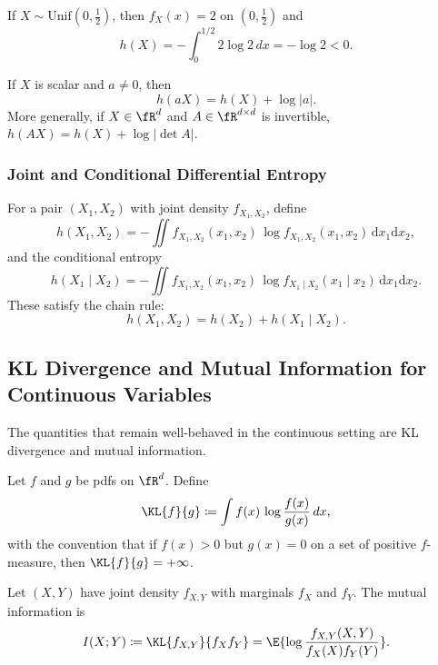 \begin{example}
If $X\sim\mathrm{Unif}(0,\tfrac12)$, then $f_X(x)=2$ on $(0,\tfrac12)$ and
\[
    h(X) = -\int_0^{1/2} 2\log 2\,dx = -\log 2 < 0.
\]
\end{example}

\begin{theorem}
If $X$ is scalar and $a\neq 0$, then
\begin{equation}
    h(aX)=h(X)+\log|a|.
\end{equation}
More generally, if $X\in\fR^d$ and $A\in\fR^{d\times d}$ is invertible,
\(h(AX)=h(X)+\log|\det A|\).
\end{theorem}


\subsubsection*{Joint and Conditional Differential Entropy}

For a pair $(X_1,X_2)$ with joint density $f_{X_1,X_2}$, define
\[
h(X_1,X_2)
=-\iint f_{X_1,X_2}(x_1,x_2)\,\log f_{X_1,X_2}(x_1,x_2)\,\mathrm{d}x_1\mathrm{d}x_2,
\]
and the conditional entropy
\[
h(X_1\mid X_2)
=-\iint f_{X_1,X_2}(x_1,x_2)\,\log f_{X_1\mid X_2}(x_1\mid x_2)\,\mathrm{d}x_1\mathrm{d}x_2.
\]
These satisfy the chain rule:
\[
h(X_1,X_2)=h(X_2)+h(X_1\mid X_2).
\]

\subsection{KL Divergence and Mutual Information for Continuous Variables}
\label{sec:diffent-mi}

The quantities that remain well-behaved in the continuous setting are KL divergence and mutual information.

\begin{definition}
Let $f$ and $g$ be pdfs on $\fR^d$.
Define
\begin{equation}
    \KL{f}{g} \coloneqq \int f(x)\,\log\frac{f(x)}{g(x)}\,dx,
\end{equation}
with the convention that if $f(x)>0$ but $g(x)=0$ on a set of positive $f$-measure, then $\KL{f}{g}=+\infty$.
\end{definition}

\begin{definition}
Let $(X,Y)$ have joint density $f_{X,Y}$ with marginals $f_X$ and $f_Y$.
The mutual information is
\begin{equation}
    I(X;Y)
    \coloneqq \KL{f_{X,Y}}{f_X f_Y}
    = \E{\log\frac{f_{X,Y}(X,Y)}{f_X(X)f_Y(Y)}}.
\end{equation}
\end{definition}

